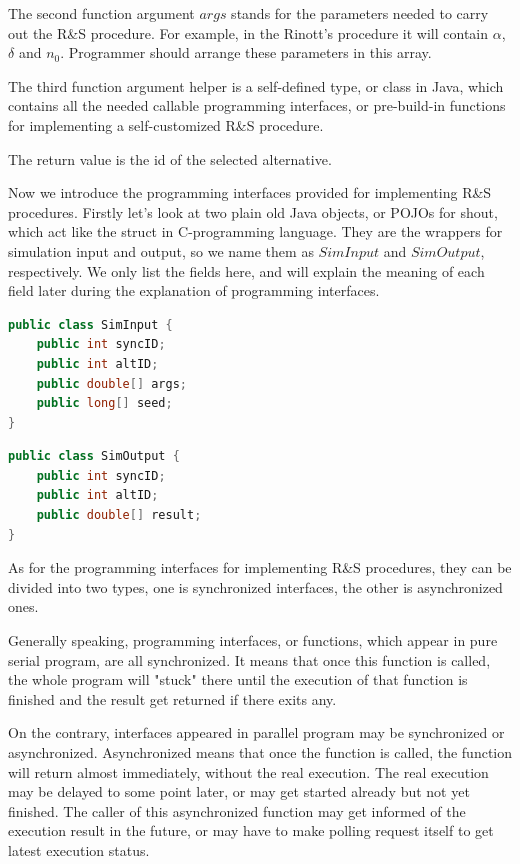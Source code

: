The second function argument $args$ stands for the parameters needed to carry out the R\&S procedure. For example, in the Rinott's procedure it will contain $\alpha$, $\delta$ and $n_0$. Programmer should arrange these parameters in this array.

The third function argument helper is a self-defined type, or class in Java, which contains all the needed callable programming interfaces, or pre-build-in functions for implementing a self-customized R\&S procedure.

The return value is the id of the selected alternative.

Now we introduce the programming interfaces provided for implementing R\&S procedures. Firstly let's look at two plain old Java objects, or POJOs for shout, which act like the struct in C-programming language. They are the wrappers for simulation input and output, so we name them as $SimInput$ and $SimOutput$, respectively. We only list the fields here, and will explain the meaning of each field later during the explanation of programming interfaces.

\begin{lstlisting}[language=Java]
public class SimInput {
	public int syncID;
	public int altID;
	public double[] args;
	public long[] seed;
}
\end{lstlisting}

\begin{lstlisting}[language=Java]
public class SimOutput {
	public int syncID;
	public int altID;
	public double[] result;
}
\end{lstlisting}

As for the programming interfaces for implementing R\&S procedures, they can be divided into two types, one is synchronized interfaces, the other is asynchronized ones.

Generally speaking, programming interfaces, or functions, which appear in pure serial program, are all synchronized. It means that once this function is called, the whole program will "stuck" there until the execution of that function is finished and the result get returned if there exits any.

On the contrary, interfaces appeared in parallel program may be synchronized or asynchronized. Asynchronized means that once the function is called, the function will return almost immediately, without the real execution. The real execution may be delayed to some point later, or may get started already but not yet finished. The caller of this asynchronized function may get informed of the execution result in the future, or may have to make polling request itself to get latest execution status.

